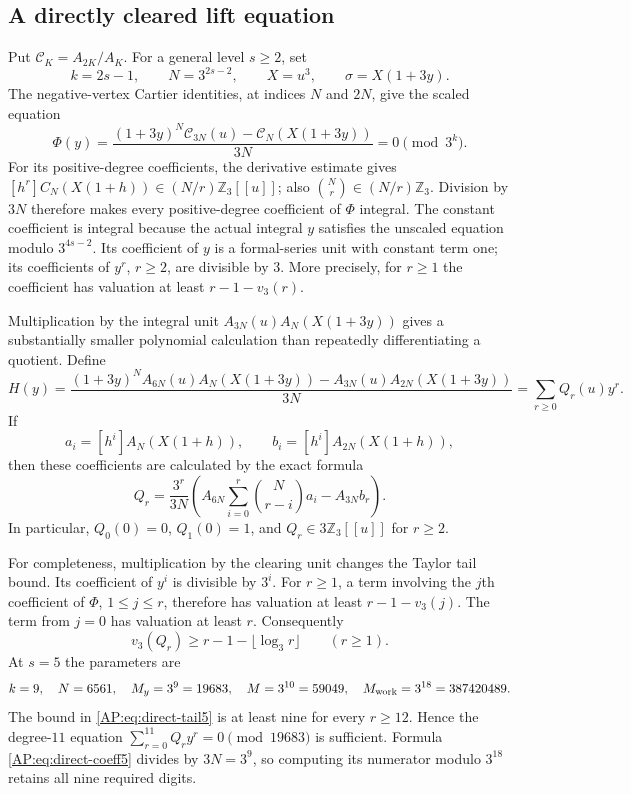 \documentclass[11pt,a4paper]{article}
\theoremstyle{definition}\newtheorem{definition}[theorem]{Definition}
\theoremstyle{remark}\newtheorem{remark}[theorem]{Remark}
\numberwithin{equation}{section}
\begin{document}
\subsection{A directly cleared lift equation}
Put $\mathcal C_K=A_{2K}/A_K$.  For a general level $s\geq2$, set
\[
 k=2s-1,\qquad N=3^{2s-2},\qquad X=u^3,\qquad
 \sigma=X(1+3y).
\]
The negative-vertex Cartier identities, at indices $N$ and $2N$,
give the scaled equation
\[
 \Phi(y)=\frac{(1+3y)^N \mathcal C_{3N}(u)-\mathcal C_N(X(1+3y))}{3N}
                       =0\pmod{3^k}.
\]
For its positive-degree coefficients, the derivative estimate gives
$[h^r]C_N(X(1+h))\in(N/r)\mathbb Z_3[[u]]$; also
$\binom Nr\in(N/r)\mathbb Z_3$.  Division by $3N$ therefore makes
every positive-degree coefficient of $\Phi$ integral.  The constant
coefficient is integral because the actual integral $y$ satisfies
the unscaled equation modulo $3^{4s-2}$.  Its coefficient
of $y$ is a formal-series unit with constant term one; its coefficients
of $y^r$, $r\geq2$, are divisible by $3$.  More precisely, for $r\geq1$
the coefficient has valuation at least $r-1-v_3(r)$.

Multiplication by the integral unit
$A_{3N}(u)A_N(X(1+3y))$ gives a substantially smaller polynomial
calculation than repeatedly differentiating a quotient.  Define
\begin{equation}\label{AP:eq:direct-hensel5}
 H(y)=\frac{(1+3y)^N A_{6N}(u)A_N(X(1+3y))-
                  A_{3N}(u)A_{2N}(X(1+3y))}{3N}
       =\sum_{r\geq0}Q_r(u)y^r.
\end{equation}
If
\[
 a_i=[h^i]A_N(X(1+h)),\qquad
 b_i=[h^i]A_{2N}(X(1+h)),
\]
then these coefficients are calculated by the exact formula
\begin{equation}\label{AP:eq:direct-coeff5}
 Q_r=\frac{3^r}{3N}
 \left(A_{6N}\sum_{i=0}^r\binom N{r-i}a_i-A_{3N}b_r\right).
\end{equation}
In particular, $Q_0(0)=0$, $Q_1(0)=1$, and
$Q_r\in3\mathbb Z_3[[u]]$ for $r\geq2$.

For completeness, multiplication by the clearing unit changes the
Taylor tail bound.  Its coefficient of $y^i$ is divisible by $3^i$.
For $r\geq1$, a term involving the $j$th coefficient of $\Phi$,
$1\leq j\leq r$, therefore has valuation at least
$r-1-v_3(j)$.  The term from $j=0$ has valuation at least $r$.
Consequently
\begin{equation}\label{AP:eq:direct-tail5}
 v_3(Q_r)\geq r-1-\lfloor\log_3 r\rfloor\qquad(r\geq1).
\end{equation}
At $s=5$ the parameters are
\[
 k=9,\quad N=6561,\quad M_y=3^9=19683,\quad
 M=3^{10}=59049,\quad M_{\rm work}=3^{18}=387420489.
\]
The bound in \eqref{AP:eq:direct-tail5} is at least nine for every
$r\geq12$.  Hence the degree-$11$ equation
$\sum_{r=0}^{11}Q_r y^r=0\pmod{19683}$ is sufficient.  Formula
\eqref{AP:eq:direct-coeff5} divides by $3N=3^9$, so computing its
numerator modulo $3^{18}$ retains all nine required digits.
\end{document}
